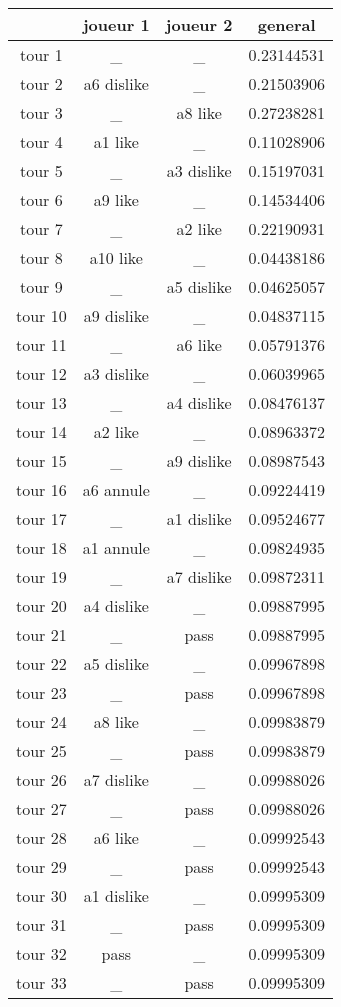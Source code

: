\documentclass{article}
\begin{document}
\begin{tabular}{|c|c|c|c|}
\hline
& joueur 1 & joueur 2 & general \\
\hline
tour 1 & \_ & \_ & 0.23144531 \\
\hline
tour 2 & a6 dislike & \_ & 0.21503906 \\
\hline
tour 3 & \_ & a8 like & 0.27238281 \\
\hline
tour 4 & a1 like & \_ & 0.11028906 \\
\hline
tour 5 & \_ & a3 dislike & 0.15197031 \\
\hline
tour 6 & a9 like & \_ & 0.14534406 \\
\hline
tour 7 & \_ & a2 like & 0.22190931 \\
\hline
tour 8 & a10 like & \_ & 0.04438186 \\
\hline
tour 9 & \_ & a5 dislike & 0.04625057 \\
\hline
tour 10 & a9 dislike & \_ & 0.04837115 \\
\hline
tour 11 & \_ & a6 like & 0.05791376 \\
\hline
tour 12 & a3 dislike & \_ & 0.06039965 \\
\hline
tour 13 & \_ & a4 dislike & 0.08476137 \\
\hline
tour 14 & a2 like & \_ & 0.08963372 \\
\hline
tour 15 & \_ & a9 dislike & 0.08987543 \\
\hline
tour 16 & a6 annule & \_ & 0.09224419 \\
\hline
tour 17 & \_ & a1 dislike & 0.09524677 \\
\hline
tour 18 & a1 annule & \_ & 0.09824935 \\
\hline
tour 19 & \_ & a7 dislike & 0.09872311 \\
\hline
tour 20 & a4 dislike & \_ & 0.09887995 \\
\hline
tour 21 & \_ & pass & 0.09887995 \\
\hline
tour 22 & a5 dislike & \_ & 0.09967898 \\
\hline
tour 23 & \_ & pass & 0.09967898 \\
\hline
tour 24 & a8 like & \_ & 0.09983879 \\
\hline
tour 25 & \_ & pass & 0.09983879 \\
\hline
tour 26 & a7 dislike & \_ & 0.09988026 \\
\hline
tour 27 & \_ & pass & 0.09988026 \\
\hline
tour 28 & a6 like & \_ & 0.09992543 \\
\hline
tour 29 & \_ & pass & 0.09992543 \\
\hline
tour 30 & a1 dislike & \_ & 0.09995309 \\
\hline
tour 31 & \_ & pass & 0.09995309 \\
\hline
tour 32 & pass & \_ & 0.09995309 \\
\hline
tour 33 & \_ & pass & 0.09995309 \\
\hline
\end{tabular}
\end{document}
